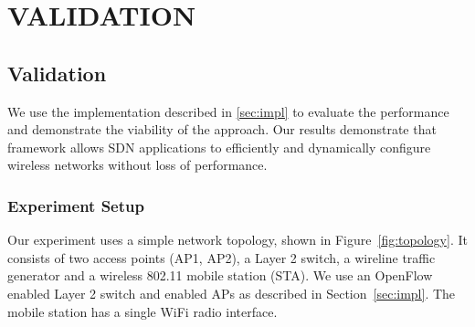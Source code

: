 \chapter{\uppercase {Validation}}
\label{sec:validations}

\section{\aetherflow Validation}


We use the \aetherflow implementation described in \ref{sec:impl} to
evaluate the performance and demonstrate the viability of the \aetherflow
approach. 
Our results demonstrate that \aetherflow framework allows SDN 
applications to efficiently and dynamically configure wireless
networks without loss of performance. 



\subsection{Experiment Setup}
Our experiment uses a simple network topology, shown in Figure~\ref{fig:topology}. 
It consists of two access points (AP1, AP2), a Layer 2 switch, a wireline 
traffic generator and a wireless 802.11 mobile station (STA).  We use an OpenFlow enabled
Layer 2 switch and  \aetherflow enabled APs as described in Section~\ref{sec:impl}. The mobile station has a single WiFi radio
interface. 

